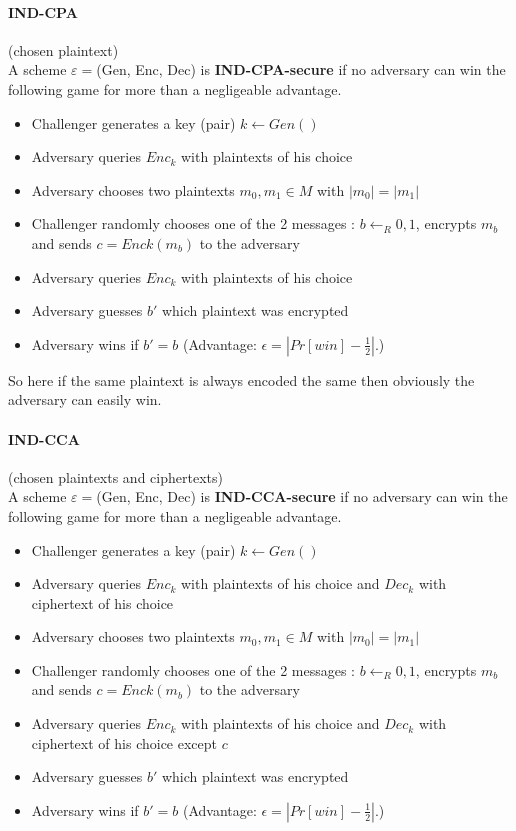 \documentclass[11pt,a4paper]{report}
\begin{document}
\paragraph{IND-CPA} (chosen plaintext)\\
A scheme $\varepsilon = $(Gen, Enc, Dec) is \textbf{IND-CPA-secure} if no adversary can win the following game for more than a negligeable advantage.
\begin{itemize}
\item Challenger generates a key (pair) $k \leftarrow Gen()$
\item Adversary queries $Enc_k$ with plaintexts of his choice
\item Adversary chooses two plaintexts $m_0, m_1 \in M$ with $|m_0| = |m_1|$
\item Challenger randomly chooses one of the 2 messages : $b \leftarrow_R {0, 1}$, encrypts $m_b$ and sends $c = Enck(m_b)$ to the adversary
\item Adversary queries $Enc_k$ with plaintexts of his choice
\item Adversary guesses $b'$ which plaintext was encrypted
\item Adversary wins if $b' = b$ (Advantage: $\epsilon = |Pr [win] - \frac{1}{2}|$.)
\end{itemize}
So here if the same plaintext is always encoded the same then obviously the adversary can easily win.

\paragraph{IND-CCA} (chosen plaintexts and ciphertexts)\\
A scheme $\varepsilon = $(Gen, Enc, Dec) is \textbf{IND-CCA-secure} if no adversary can win the following game for more than a negligeable advantage.
\begin{itemize}
\item Challenger generates a key (pair) $k \leftarrow Gen()$
\item Adversary queries $Enc_k$ with plaintexts of his choice and $Dec_k$ with ciphertext of his choice
\item Adversary chooses two plaintexts $m_0, m_1 \in M$ with $|m_0| = |m_1|$
\item Challenger randomly chooses one of the 2 messages : $b \leftarrow_R {0, 1}$, encrypts $m_b$ and sends $c = Enck(m_b)$ to the adversary
\item Adversary queries $Enc_k$ with plaintexts of his choice and $Dec_k$ with ciphertext of his choice except $c$
\item Adversary guesses $b'$ which plaintext was encrypted
\item Adversary wins if $b' = b$ (Advantage: $\epsilon = |Pr [win] - \frac{1}{2} |$.)
\end{itemize}
\end{document}
